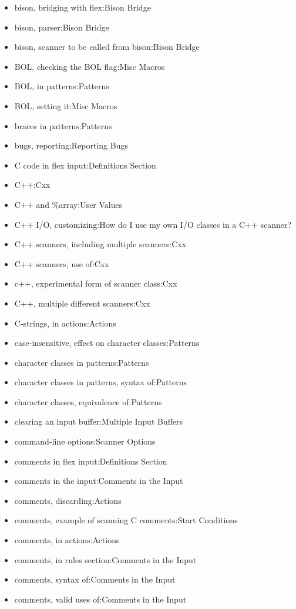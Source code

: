 \documentclass[openany,oneside]{book}
\begin{document}
\begin{itemize}
\item bison, bridging with flex:Bison Bridge
\item bison, parser:Bison Bridge
\item bison, scanner to be called from bison:Bison Bridge
\item BOL, checking the BOL flag:Misc Macros
\item BOL, in patterns:Patterns
\item BOL, setting it:Misc Macros
\item braces in patterns:Patterns
\item bugs, reporting:Reporting Bugs
\item C code in flex input:Definitions Section
\item C++:Cxx
\item C++ and \%{}array:User Values
\item C++ I/O, customizing:How do I use my own I/O classes in a C++ scanner?
\item C++ scanners, including multiple scanners:Cxx
\item C++ scanners, use of:Cxx
\item c++, experimental form of scanner class:Cxx
\item C++, multiple different scanners:Cxx
\item C-strings, in actions:Actions
\item case-insensitive, effect on character classes:Patterns
\item character classes in patterns:Patterns
\item character classes in patterns, syntax of:Patterns
\item character classes, equivalence of:Patterns
\item clearing an input buffer:Multiple Input Buffers
\item command-line options:Scanner Options
\item comments in flex input:Definitions Section
\item comments in the input:Comments in the Input
\item comments, discarding:Actions
\item comments, example of scanning C comments:Start Conditions
\item comments, in actions:Actions
\item comments, in rules section:Comments in the Input
\item comments, syntax of:Comments in the Input
\item comments, valid uses of:Comments in the Input

\end{itemize}
\end{document}
